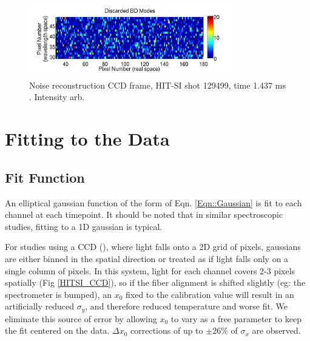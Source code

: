 \begin{center}
\begin{figure}
\end{figure}
\begin{figure}
\includegraphics[width=3.5in]{BD_Discard}\caption{Noise reconstruction CCD frame, HIT-SI shot 129499, time 1.437 ms \cite{hossack2015study}. Intensity arb.}\label{BD Noise}
\end{figure}
\end{center}




\section{Fitting to the Data}\label{sec:Fit}
\subsection{Fit Function}
An elliptical gaussian function of the form of Eqn. \ref{Eqn::Gaussian} is fit to each channel at each timepoint. It should be noted that in similar spectroscopic studies, fitting to a 1D gaussian is typical. 
For studies using a CCD (\cite{den1994fast}\cite{rapisarda2007role}\cite{bamford1992combination}), where light falls onto a 2D grid of pixels, gaussians are either binned in the spatial direction or treated as if light falls only on a single column of pixels. In this system, light for each channel covers 2-3 pixels spatially (Fig \ref{HITSI_CCD}), so if the fiber alignment is shifted slightly (eg: the spectrometer is bumped), an $x_0$ fixed to the calibration value will result in an artificially reduced $\sigma_y$, and therefore reduced temperature and worse fit. We eliminate this source of error by allowing $x_0$ to vary as a free parameter to keep the fit centered on the data. $\Delta{x_0}$ corrections of up to $\pm26\%$ of $\sigma_x$ are observed.\\



